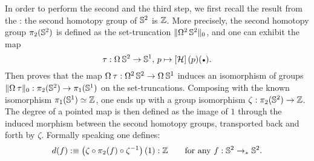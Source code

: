 \documentclass[english,a4]{article}
\renewcommand{\ap}[1]{\left[{#1}\right]}
\newcommand{\ptdto}{\to_\ast}%
\newcommand{\setTrunc}[1]{\Trunc{#1}_0}
\begin{document}
In order to perform the second and the third step, we first recall the result from the
\cite[Cor. 8.5.2]{HoTT}: the second homotopy group of ${{\mathbb S^{2}}}$ is $\mathbb{Z}$. More precisely, the
second homotopy group $\pi_2({{\mathbb S^{2}}})$ is defined as the set-truncation
$\setTrunc{\loopspace 2 \Sp}$, and one can exhibit the map
\begin{displaymath}
  \tau: \loopspace\null\Sp \to \Sc, \, p \mapsto \ap\hopf(p)(\base).
\end{displaymath}
Then \cite[Section 8.4 and 8.5]{HoTT} proves that the map $\loopspace\null\tau :
\loopspace 2 \Sp \to \loopspace \null \Sc$ induces an isomorphism of groups
$\setTrunc{\loopspace\null\tau}: \pi_2(\Sp) \to \pi_1(\Sc)$ on the set-truncations.
Composing with the known isomorphism $\pi_1({{\mathbb S^{1}}}) \simeq \mathbb{Z}$, one
ends up with a group isomorphism $\zeta: \pi_2({{\mathbb S^{2}}}) \to \mathbb{Z}$. The degree of a
pointed map is then defined as the image of $1$ through the induced morphism
between the second homotopy groups, transported back and forth by $\zeta$. 
Formally speaking one defines: 
\begin{displaymath}
  d(f) \defequi \left(\zeta\circ\pi_2(f)\circ \inv\zeta\right)(1):\ZZ \qquad
  \text{for any}\ f:\Sp\ptdto\Sp.
\end{displaymath}
\end{document}
